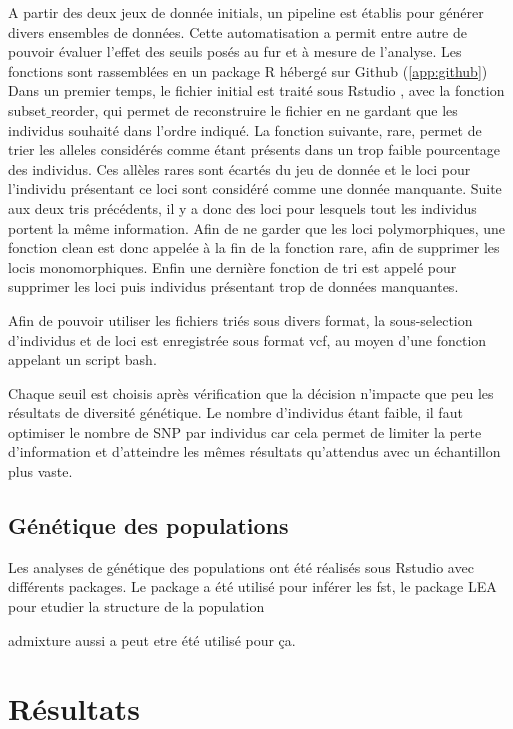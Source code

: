 \documentclass[12pt,a4paper,notitlepage]{article}
\begin{document}
A partir des deux jeux de donnée initials, un pipeline est établis pour générer divers ensembles de données. Cette automatisation a permit entre autre de pouvoir évaluer l'effet des seuils posés au fur et à mesure de l'analyse. Les fonctions sont rassemblées en un package R hébergé sur Github (\autoref{app:github})
Dans un premier temps, le fichier initial est traité sous Rstudio \citep{RTeam2017}, avec la fonction subset$\_$reorder, qui permet de reconstruire le fichier en ne gardant que les individus souhaité dans l'ordre indiqué. La fonction suivante, rare, permet de trier les alleles considérés comme étant présents dans un trop faible pourcentage des individus. Ces allèles rares sont écartés du jeu de donnée et le loci pour l'individu présentant ce loci sont considéré comme une donnée manquante. Suite aux deux tris précédents, il y a donc des loci pour lesquels tout les individus portent la même information. Afin de ne garder que les loci polymorphiques, une fonction clean est donc appelée à la fin de la fonction rare, afin de supprimer les locis monomorphiques.
Enfin une dernière fonction de tri est appelé pour supprimer les loci puis individus présentant trop de données manquantes.

Afin de pouvoir utiliser les fichiers triés sous divers format, la sous-selection d'individus et de loci est enregistrée sous format vcf, au moyen d'une fonction appelant un script bash.


Chaque seuil est choisis après vérification que la décision n'impacte que peu les résultats de diversité génétique.
Le nombre d'individus étant faible, il faut optimiser le nombre de SNP par individus car cela permet de limiter la perte d'information et d'atteindre les mêmes résultats qu'attendus avec un échantillon plus vaste. \citep{Nazareno2017}

\subsection{Génétique des populations}

Les analyses de génétique des populations ont été réalisés sous Rstudio \citep{RTeam2017} avec différents packages. Le package a été utilisé pour inférer les fst, le package LEA pour etudier la structure de la population

admixture aussi a peut etre été utilisé pour ça.

\section{Résultats}
\end{document}
